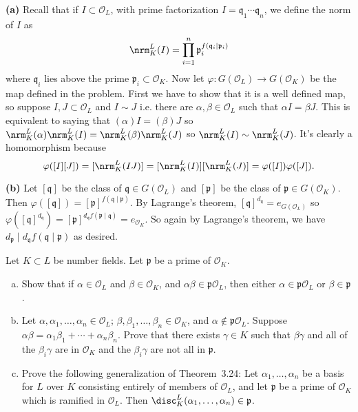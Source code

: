 \documentclass[11pt,letterpaper]{article}
\begin{document}
\begin{solution}
    \textbf{(a)} Recall that if $I \subset \mathcal{O}_L$, with prime factorization $I=\mathfrak{q}_1\cdots \mathfrak{q}_n$, we define the norm of $I$ as
    \[
        \nrm^L_K(I)=\prod_{i=1}^n \mathfrak{p}_i^{f(\mathfrak{q}_i \mid \mathfrak{p}_i)}
    \]
    where $\mathfrak{q}_i$ lies above the prime $\mathfrak{p}_i\subset \mathcal{O}_K$. Now let $\varphi : G(\mathcal{O}_L) \to G(\mathcal{O}_K)$ be the map defined in the problem. First we have to show that it is a well defined map, so suppose $I,J\subset \mathcal{O}_L$ and $I\sim J$ i.e. there are $\alpha,\beta\in \mathcal{O}_L$ such that $\alpha I = \beta J$. This is equivalent to saying that $(\alpha)I=(\beta)J$ so $\nrm^L_K(\alpha)\nrm^L_K(I)=\nrm^L_K(\beta)\nrm^L_K(J)$ so $\nrm^L_K(I)\sim \nrm^L_K(J)$. It's clearly a homomorphism because $$\varphi([I][J])=[\nrm^L_K(IJ)]=[\nrm^L_K(I)][\nrm^L_K(J)]=\varphi([I])\varphi([J]).$$ 
    
    \textbf{(b)} Let $[\mathfrak{q}]$ be the class of $\mathfrak{q}\in G(\mathcal{O}_L)$ and $[\mathfrak{p}]$ be the class of $\mathfrak{p}\in G(\mathcal{O}_K)$. Then $\varphi([\mathfrak{q}])=[\mathfrak{p}]^{f(\mathfrak{q}\mid\mathfrak{p})}$. By Lagrange's theorem, $[\mathfrak{q}]^{d_{\mathfrak{q}}}=e_{G(\mathcal{O}_L)}$ so $\varphi([\mathfrak{q}]^{d_{\mathfrak{q}}})=[\mathfrak{p}]^{d_{\mathfrak{q}}f(\mathfrak{p}\mid\mathfrak{q})}=e_{\mathcal{O}_K}$. So again by Lagrange's theorem, we have $d_{\mathfrak{p}} \mid d_{\mathfrak{q}}f(\mathfrak{q} \mid\mathfrak{p})$ as desired. 
\end{solution}

\begin{cproblem}{3.19} Let $K\subset L$ be number fields. Let $\mathfrak{p}$ be a prime of $\mathcal{O}_K$.
    \begin{enumerate}[(a)]
        \item Show that if $\alpha\in \mathcal{O}_L$ and $\beta\in \mathcal{O}_K$, and $\alpha\beta\in \mathfrak{p} \mathcal{O}_L$, then either $\alpha\in \mathfrak{p} \mathcal{O}_L$ or $\beta\in \mathfrak{p}$.
        \item Let $\alpha, \alpha_1, \ldots, \alpha_n\in \mathcal{O}_L$; $\beta,\beta_1,\ldots,\beta_n\in \mathcal{O}_K$, and $\alpha\not\in \mathfrak{p}\mathcal{O}_L$. Suppose $\alpha\beta=\alpha_1\beta_1+\cdots+\alpha_n\beta_n$. Prove that there exists $\gamma\in K$ such that $\beta\gamma$ and all of the $\beta_i\gamma$ are in $\mathcal{O}_K$ and the $\beta_i\gamma$ are not all in $\mathfrak{p}$. 
        \item Prove the following generalization of Theorem~3.24: Let $\alpha_1,\ldots,\alpha_n$ be a basis for $L$ over $K$ consisting entirely of members of $\mathcal{O}_L$, and let $\mathfrak{p}$ be a prime of $\mathcal{O}_K$ which is ramified in $\mathcal{O}_L$. Then $\disc^L_K(\alpha_1,\ldots,\alpha_n)\in \mathfrak{p}$. 
    \end{enumerate}
\end{cproblem}
\end{document}
